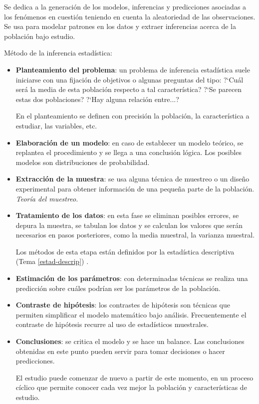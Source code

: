 Se dedica a la generación de los modelos, inferencias y predicciones asociadas a los fenómenos en cuestión teniendo en cuenta la aleatoriedad de las observaciones. Se usa para modelar patrones en los datos y extraer inferencias acerca de la población bajo estudio. 

\vspace{4mm}Método de la inferencia estadística:

\begin{itemize}
\item \textbf{Planteamiento del problema}: un problema de inferencia estadística suele iniciarse con una fijación de objetivos o algunas preguntas del tipo:
?`Cuál será la media de esta población respecto a tal característica?
?`Se parecen estas dos poblaciones?
?`Hay alguna relación entre...?

En el planteamiento se definen con precisión la población, la característica a estudiar, las variables, etc.
\item \textbf{Elaboración de un modelo}: en caso de establecer un modelo teórico, se replantea el procedimiento y se llega a una conclusión lógica. Los posibles modelos son distribuciones de probabilidad.
\item \textbf{Extracción de la muestra}: se usa alguna técnica de muestreo o un diseño experimental para obtener información de una pequeña parte de la población. \emph{Teoría del muestreo.}
\item \textbf{Tratamiento de los datos}: en esta fase se eliminan posibles errores, se depura la muestra, se tabulan los datos y se calculan los valores que serán necesarios en pasos posteriores, como la media muestral, la varianza muestral.

Los métodos de esta etapa están definidos por la estadística descriptiva (Tema \ref{estad-descrip}) .

\item \textbf{Estimación de los parámetros}: con determinadas técnicas se realiza una predicción sobre cuáles podrían ser los parámetros de la población.
\item \textbf{Contraste de hipótesis}: los contrastes de hipótesis son técnicas que permiten simplificar el modelo matemático bajo análisis. Frecuentemente el contraste de hipótesis recurre al uso de estadísticos muestrales.
\item \textbf{Conclusiones}: se critica el modelo y se hace un balance. Las conclusiones obtenidas en este punto pueden servir para tomar decisiones o hacer predicciones.

El estudio puede comenzar de nuevo a partir de este momento, en un proceso cíclico que permite conocer cada vez mejor la población y características de estudio.
\end{itemize}


